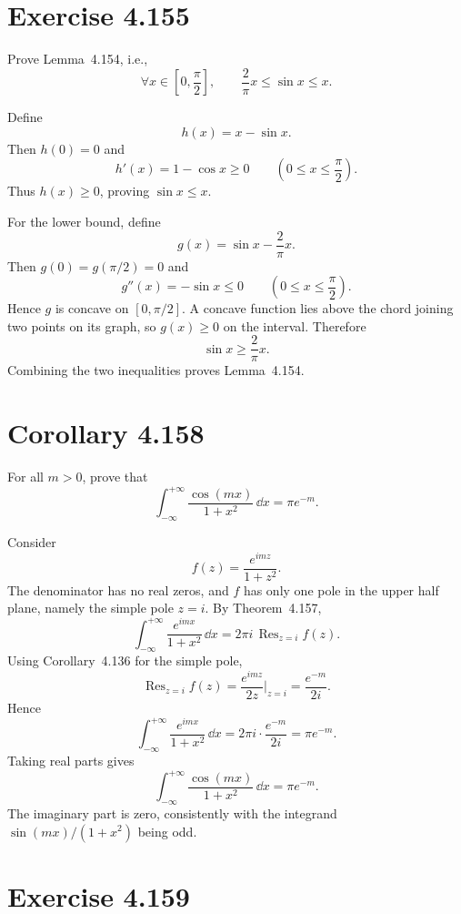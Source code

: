 \documentclass{article}
\newcommand{\Res}{\operatorname{Res}}
\begin{document}
\section{Exercise 4.155}

Prove Lemma~4.154, i.e.,
\[
  \forall x\in\left[0,\frac{\pi}{2}\right],
  \qquad
  \frac{2}{\pi}x\le \sin x\le x.
\]

\begin{solution}
  Define
  \[
    h(x)=x-\sin x.
  \]
  Then $h(0)=0$ and
  \[
    h'(x)=1-\cos x\ge 0
    \qquad
    \left(0\le x\le \frac{\pi}{2}\right).
  \]
  Thus $h(x)\ge 0$, proving $\sin x\le x$.

  For the lower bound, define
  \[
    g(x)=\sin x-\frac{2}{\pi}x.
  \]
  Then $g(0)=g(\pi/2)=0$ and
  \[
    g''(x)=-\sin x\le 0
    \qquad
    \left(0\le x\le \frac{\pi}{2}\right).
  \]
  Hence $g$ is concave on $[0,\pi/2]$. A concave function lies above the
  chord joining two points on its graph, so $g(x)\ge 0$ on the interval.
  Therefore
  \[
    \sin x\ge \frac{2}{\pi}x.
  \]
  Combining the two inequalities proves Lemma~4.154.
\end{solution}

\section{Corollary 4.158}

For all $m>0$, prove that
\[
  \int_{-\infty}^{+\infty}\frac{\cos(mx)}{1+x^2}\,\dd x
  =\pi e^{-m}.
\]

\begin{solution}
  Consider
  \[
    f(z)=\frac{e^{imz}}{1+z^2}.
  \]
  The denominator has no real zeros, and $f$ has only one pole in the upper
  half plane, namely the simple pole $z=i$. By Theorem~4.157,
  \[
    \int_{-\infty}^{+\infty}\frac{e^{imx}}{1+x^2}\,\dd x
    =
    2\pi i\,\Res_{z=i}f(z).
  \]
  Using Corollary~4.136 for the simple pole,
  \[
    \Res_{z=i}f(z)
    =
    \frac{e^{imz}}{2z}\bigg|_{z=i}
    =
    \frac{e^{-m}}{2i}.
  \]
  Hence
  \[
    \int_{-\infty}^{+\infty}\frac{e^{imx}}{1+x^2}\,\dd x
    =
    2\pi i\cdot \frac{e^{-m}}{2i}
    =
    \pi e^{-m}.
  \]
  Taking real parts gives
  \[
    \int_{-\infty}^{+\infty}\frac{\cos(mx)}{1+x^2}\,\dd x
    =\pi e^{-m}.
  \]
  The imaginary part is zero, consistently with the integrand
  $\sin(mx)/(1+x^2)$ being odd.
\end{solution}

\section{Exercise 4.159}
\end{document}

